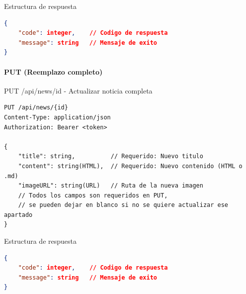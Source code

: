 \documentclass[11pt,a4paper]{article}
\begin{document}
\begin{center}
	\begin{minipage}{\textwidth}
		\begin{codebox}{Estructura de respuesta}
			\begin{lstlisting}[language=json]
{
    "code": integer,    // Codigo de respuesta
    "message": string   // Mensaje de exito
}
\end{lstlisting}
		\end{codebox}
	\end{minipage}
\end{center}

\paragraph{PUT (Reemplazo completo)}
\begin{center}
	\begin{minipage}{\textwidth}
		\begin{codebox}{PUT /api/news/{id} - Actualizar noticia completa}
			\begin{lstlisting}[language=HTTP]
PUT /api/news/{id}
Content-Type: application/json
Authorization: Bearer <token>

{
    "title": string,          // Requerido: Nuevo titulo
    "content": string(HTML),  // Requerido: Nuevo contenido (HTML o .md)
    "imageURL": string(URL)   // Ruta de la nueva imagen
    // Todos los campos son requeridos en PUT, 
    // se pueden dejar en blanco si no se quiere actualizar ese apartado
}
\end{lstlisting}
		\end{codebox}
	\end{minipage}
\end{center}

\begin{center}
    \begin{minipage}{\textwidth}
        \begin{codebox}{Estructura de respuesta}
            \begin{lstlisting}[language=json]
{
    "code": integer,    // Codigo de respuesta
    "message": string   // Mensaje de exito
}
\end{lstlisting}
        \end{codebox}
    \end{minipage}
\end{center}
\end{document}
